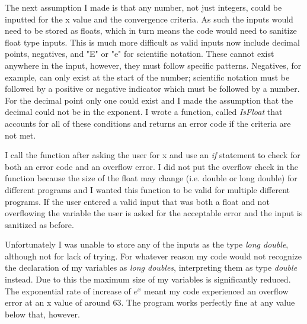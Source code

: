 \documentclass{article}
\begin{document}
The next assumption I made is that any number, not just integers, could be inputted for the x value and the convergence criteria. As such the inputs would need to be stored as floats, which in turn means the code would need to sanitize float type inputs. This is much more difficult as valid inputs now include decimal points, negatives, and "E" or "e" for scientific notation. These cannot exist anywhere in the input, however, they must follow specific patterns. Negatives, for example, can only exist at the start of the number; scientific notation must be followed by a positive or negative indicator which must be followed by a number. For the decimal point only one could exist and I made the assumption that the decimal could not be in the exponent. I wrote a function, called \textit{IsFloat} that accounts for all of these conditions and returns an error code if the criteria are not met. 

I call the function after asking the user for x and use an \textit{if} statement to check for both an error code and an overflow error. I did not put the overflow check in the function because the size of the float may change (i.e. double or long double) for different programs and I wanted this function to be valid for multiple different programs. If the user entered a valid input that was both a float and not overflowing the variable the user is asked for the acceptable error and the input is sanitized as before. 

Unfortunately I was unable to store any of the inputs as the type \textit{long double}, although not for lack of trying. For whatever reason my code would not recognize the declaration of my variables as \textit{long doubles}, interpreting them as type \textit{double} instead. Due to this the maximum size of my variables is significantly reduced. The exponential rate of increase of $e^x$ meant my code experienced an overflow error at an x value of around 63. The program works perfectly fine at any value below that, however.
\end{document}
